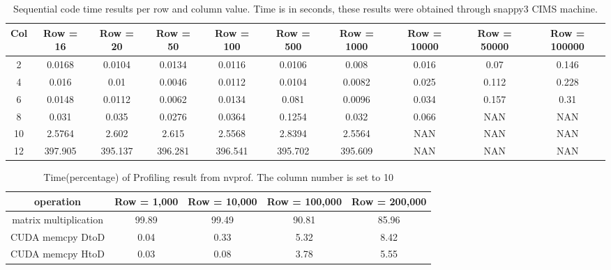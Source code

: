 \documentclass[letterpaper, 10 pt, conference]{ieeeconf}  %
\begin{document}
\begin{table}[h]
\centering
\begin{center}
\begin{tabular}{|c|c|c|c|c|c|c|c|c|c|}
\hline
Col & Row = 16 & Row = 20 & Row = 50 & Row = 100 & Row = 500 & Row = 1000 & Row = 10000 & Row = 50000 & Row = 100000\\
\hline
2 & 0.0168 & 0.0104 & 0.0134 & 0.0116 & 0.0106 & 0.008 & 0.016 & 0.07 & 0.146 \\
\hline
4 & 0.016 & 0.01 & 0.0046 & 0.0112 & 0.0104 & 0.0082 & 0.025 & 0.112 & 0.228 \\
\hline
6 & 0.0148 & 0.0112 & 0.0062 & 0.0134 & 0.081 & 0.0096 & 0.034 & 0.157 & 0.31 \\
\hline
8 & 0.031 & 0.035 & 0.0276 & 0.0364 & 0.1254 & 0.032 & 0.066 & NAN & NAN \\
\hline
10 & 2.5764 & 2.602 & 2.615 & 2.5568 & 2.8394 & 2.5564 & NAN & NAN & NAN \\
\hline
12 & 397.905 & 395.137 & 396.281 & 396.541 & 395.702 & 395.609 & NAN & NAN & NAN \\
\hline
\end{tabular}
\caption{Sequential code time results per row and column value. Time is in seconds, these results were obtained through snappy3 CIMS machine.}
\label{sequential}
\end{center}
\end{table}

\begin{table}[h]
\centering
\begin{center}
\begin{tabular}{|c|c|c|c|c|}
\hline
operation & Row = 1,000 & Row = 10,000 & Row = 100,000 & Row = 200,000 \\
\hline
matrix multiplication & 99.89 & 99.49 & 90.81 & 85.96 \\
\hline
CUDA memcpy DtoD & 0.04 & 0.33 & 5.32 & 8.42 \\
\hline
CUDA memcpy HtoD & 0.03 & 0.08 & 3.78 & 5.55 \\
\hline
\end{tabular}
\caption{Time(percentage) of Profiling result from nvprof. The column number is set to 10}
\label{cudaprof}
\end{center}
\end{table}
\end{document}
